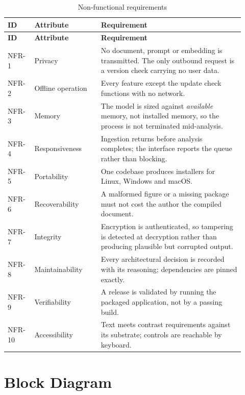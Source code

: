 \documentclass[12pt,a4paper]{report}
\begin{document}
\begin{longtable}{@{}p{0.10\linewidth}p{0.26\linewidth}p{0.56\linewidth}@{}}
\caption{Non-functional requirements}\label{tab:nfr}\\
\toprule
\textbf{ID} & \textbf{Attribute} & \textbf{Requirement} \\
\midrule
\endfirsthead
\toprule
\textbf{ID} & \textbf{Attribute} & \textbf{Requirement} \\
\midrule
\endhead

NFR-1 & Privacy & No document, prompt or embedding is transmitted. The only
        outbound request is a version check carrying no user data. \\
NFR-2 & Offline operation & Every feature except the update check functions
        with no network. \\
NFR-3 & Memory & The model is sized against \emph{available} memory, not
        installed memory, so the process is not terminated mid-analysis. \\
NFR-4 & Responsiveness & Ingestion returns before analysis completes; the
        interface reports the queue rather than blocking. \\
NFR-5 & Portability & One codebase produces installers for Linux, Windows and
        macOS. \\
NFR-6 & Recoverability & A malformed figure or a missing package must not cost
        the author the compiled document. \\
NFR-7 & Integrity & Encryption is authenticated, so tampering is detected at
        decryption rather than producing plausible but corrupted output. \\
NFR-8 & Maintainability & Every architectural decision is recorded with its
        reasoning; dependencies are pinned exactly. \\
NFR-9 & Verifiability & A release is validated by running the packaged
        application, not by a passing build. \\
NFR-10 & Accessibility & Text meets contrast requirements against its
        substrate; controls are reachable by keyboard. \\
\bottomrule
\end{longtable}

\section{Block Diagram}
\end{document}

